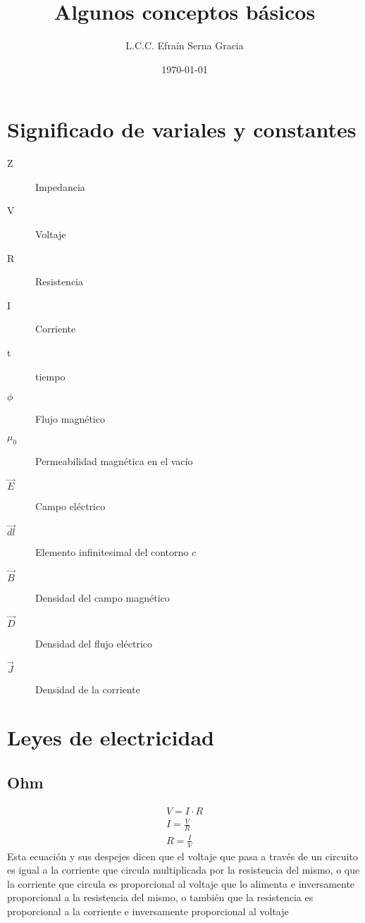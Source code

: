 \documentclass[12pt,spanish,lettersize,twocolumn]{article}
\title{\color{Maroon}Algunos conceptos b\'asicos}
\author{L.C.C. Efra\'in Serna Gracia}
\date{\color{gray}\today}
\begin{document}
\maketitle
\section{Significado de variales y constantes}
\begin{multicols}{2}
\begin{description}
\item[Z] Impedancia
\item[V] Voltaje
\item[R] Resistencia
\item[I] Corriente
\item[t] tiempo
\item[$\phi$] Flujo magn\'etico
\item[$\mu_{0}$] Permeabilidad magn\'etica en el vac\'io
\item[$\overrightarrow{E}$] Campo el\'ectrico
\item[$\overrightarrow{dl}$] Elemento infinitesimal del contorno $c$
\item[$\overrightarrow{B}$] Densidad del campo magn\'etico
\item[$\overrightarrow{D}$] Densidad del flujo el\'ectrico
\item[$\overrightarrow{J}$] Densidad de la corriente
\end{description}
\end{multicols}

\section{Leyes de electricidad}

\subsection{Ohm}
\begin{eqnarray}
V=I\cdot R\\
\nonumber I=\frac{V}{R}\\
\nonumber R=\frac{I}{V}
\end{eqnarray}
Esta ecuaci\'on y sus despejes dicen que el voltaje que pasa a trav\'es de un circuito es igual a la corriente que circula multiplicada por la resistencia del mismo, o que la corriente que circula es proporcional al voltaje que lo alimenta e inversamente proporcional a la resistencia del mismo, o tambi\'en que la resistencia es proporcional a la corriente e inversamente proporcional al voltaje
\end{document}
